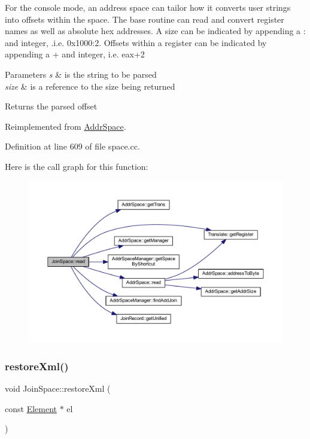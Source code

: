 For the console mode, an address space can tailor how it converts user strings into offsets within the space. The base routine can read and convert register names as well as absolute hex addresses. A size can be indicated by appending a \textquotesingle{}\+:\textquotesingle{} and integer, .i.\+e. 0x1000\+:2. Offsets within a register can be indicated by appending a \textquotesingle{}+\textquotesingle{} and integer, i.\+e. eax+2 
\begin{DoxyParams}{Parameters}
{\em s} & is the string to be parsed \\
\hline
{\em size} & is a reference to the size being returned \\
\hline
\end{DoxyParams}
\begin{DoxyReturn}{Returns}
the parsed offset 
\end{DoxyReturn}


Reimplemented from \mbox{\hyperlink{class_addr_space_ad0a4a2744ee7de8f592dfaf817a6c93b}{Addr\+Space}}.



Definition at line 609 of file space.\+cc.

Here is the call graph for this function\+:
\nopagebreak
\begin{figure}[H]
\begin{center}
\leavevmode
\includegraphics[width=350pt]{class_join_space_a8f644b1eaf92bece425a3712a205fa3b_cgraph}
\end{center}
\end{figure}
\mbox{\label{class_join_space_a55fb2e082c5547f3b4ff4022de86c895}} 
\subsubsection{\texorpdfstring{restoreXml()}{restoreXml()}}
{\footnotesize\ttfamily void Join\+Space\+::restore\+Xml (\begin{DoxyParamCaption}\item[{const \mbox{\hyperlink{class_element}{Element}} $\ast$}]{el }\end{DoxyParamCaption})\hspace{0.3cm}{\ttfamily [virtual]}}



